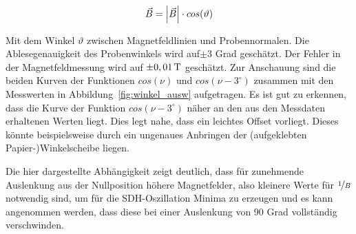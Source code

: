 \begin{equation}
	\vec{B} = \left| \vec{B} \right| \cdot cos(\vartheta)
	\label{eq:winkelabh_skalarprodukt}
\end{equation}

Mit dem Winkel $\vartheta$ zwischen Magnetfeldlinien und Probennormalen. Die Ablesegenauigkeit des Probenwinkels wird auf$\pm 3 $ Grad geschätzt. Der Fehler in der Magnetfeldmessung wird auf $\pm \unit[0,01]{T}$ geschätzt. %
Zur Anschauung sind die beiden Kurven der Funktionen $cos(\nu)$ und $cos(\nu-3^{\circ})$ zusammen mit den Messwerten in Abbildung~\ref{fig:winkel_ausw} aufgetragen. Es ist gut zu erkennen, dass die Kurve der Funktion $cos(\nu-3^{\circ})$ näher an den aus den Messdaten erhaltenen Werten liegt. Dies legt nahe, dass ein leichtes Offset vorliegt. Dieses könnte beispielsweise durch ein ungenaues Anbringen der (aufgeklebten Papier-)Winkelscheibe liegen.

Die hier dargestellte Abhängigkeit zeigt deutlich, dass für zunehmende Auslenkung aus der Nullposition höhere Magnetfelder, also kleinere Werte für $\nicefrac{1}{B}$ notwendig sind, um für die SDH-Oszillation Minima zu erzeugen und es kann angenommen werden, dass diese bei einer Auslenkung von 90 Grad vollständig verschwinden. 

